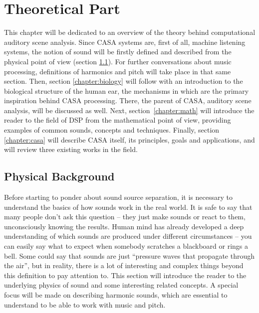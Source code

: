 \chapter{Theoretical Part}\label{chapter:theory}

This chapter will be dedicated to an overview of the theory behind computational auditory scene analysis. Since CASA systems are, first of all, machine listening systems, the notion of sound will be firstly defined and described from the physical point of view (section \ref{chapter:physics}). For further conversations about music processing, definitions of harmonics and pitch will take place in that same section. Then, section \ref{chapter:biology} will follow with an introduction to the biological structure of the human ear, the mechanisms in which are the primary inspiration behind CASA processing. There, the parent of CASA, auditory scene analysis, will be discussed as well. Next, section~\ref{chapter:math} will introduce the reader to the field of DSP from the mathematical point of view, providing examples of common sounds, concepts and techniques. Finally, section \ref{chapter:casa} will describe CASA itself, its principles, goals and applications, and will review three existing works in the field.

\section{Physical Background}\label{chapter:physics}

Before starting to ponder about sound source separation, it is necessary to understand the basics of how sounds work in the real world. It is safe to say that many people don’t ask this question – they just make sounds or react to them, unconsciously knowing the results. Human mind has already developed a deep understanding of which sounds are produced under different circumstances – you can easily say what to expect when somebody scratches a blackboard or rings a bell. Some could say that sounds are just “pressure waves that propagate through the air”, but in reality, there is a lot of interesting and complex things beyond this definition to pay attention to. This section will introduce the reader to the underlying physics of sound and some interesting related concepts. A special focus will be made on describing harmonic sounds, which are essential to understand to be able to work with music and pitch.

